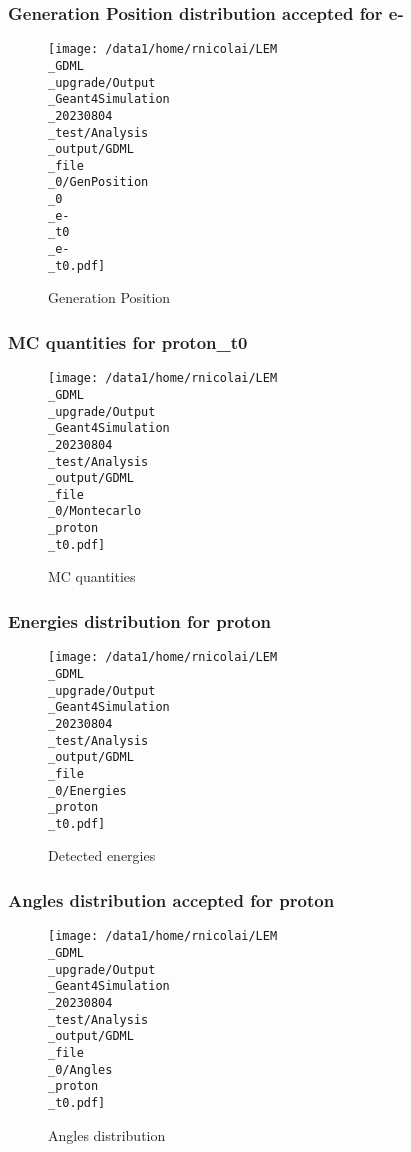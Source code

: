 \documentclass[8pt]{beamer}
\begin{document}
            \begin{frame}
                \frametitle{Generation Position distribution accepted for e-}
            
        \begin{figure}[h]
            \centering
            \texttt{[image: /data1/home/rnicolai/LEM\\\_GDML\\\_upgrade/Output\\\_Geant4Simulation\\\_20230804\\\_test/Analysis\\\_output/GDML\\\_file\\\_0/GenPosition\\\_0\\\_e-\\\_t0\\\_e-\\\_t0.pdf]}
            \caption{Generation Position}
        \end{figure}
        
            \end{frame}
            
            \begin{frame}
                \frametitle{MC quantities for proton\_t0}
            
        \begin{figure}[h]
            \centering
            \texttt{[image: /data1/home/rnicolai/LEM\\\_GDML\\\_upgrade/Output\\\_Geant4Simulation\\\_20230804\\\_test/Analysis\\\_output/GDML\\\_file\\\_0/Montecarlo\\\_proton\\\_t0.pdf]}
            \caption{MC quantities}
        \end{figure}
        
            \end{frame}
            
            \begin{frame}
                \frametitle{Energies distribution for proton}
            
        \begin{figure}[h]
            \centering
            \texttt{[image: /data1/home/rnicolai/LEM\\\_GDML\\\_upgrade/Output\\\_Geant4Simulation\\\_20230804\\\_test/Analysis\\\_output/GDML\\\_file\\\_0/Energies\\\_proton\\\_t0.pdf]}
            \caption{Detected energies}
        \end{figure}
        
            \end{frame}
            
            \begin{frame}
                \frametitle{Angles distribution accepted for proton}
            
        \begin{figure}[h]
            \centering
            \texttt{[image: /data1/home/rnicolai/LEM\\\_GDML\\\_upgrade/Output\\\_Geant4Simulation\\\_20230804\\\_test/Analysis\\\_output/GDML\\\_file\\\_0/Angles\\\_proton\\\_t0.pdf]}
            \caption{Angles distribution}
        \end{figure}
        
            \end{frame}
            
\end{document}
